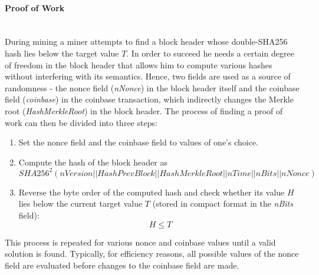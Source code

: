 \paragraph{Proof of Work}~\\
During mining a miner attempts to find a block header whose double-SHA256 hash lies below the target value $T$. In order to succeed he needs a certain degree of freedom in the block header that allows him to compute various hashes without interfering with its semantics. Hence, two fields are used as a source of randomness - the nonce field (\textit{nNonce}) in the block header itself and the coinbase field (\textit{coinbase}) in the coinbase transaction, which indirectly changes the Merkle root (\textit{HashMerkleRoot}) in the block header. The process of finding a proof of work can then be divided into three steps:

\begin{enumerate}[label=\arabic*), leftmargin=1cm]
\item Set the nonce field and the coinbase field to values of one's choice.
\item Compute the hash of the block header as
\begin{equation}
SHA256^{2}(nVersion||HashPrevBlock||HashMerkleRoot||nTime||nBits||nNonce)
\label{eqn:HashBlock}
\end{equation}
\item Reverse the byte order of the computed hash and check whether its value $\mathit{H}$ lies below the current target value $\mathit{T}$ (stored in compact format in the \textit{nBits} field):
\begin{equation}
H \leq T
\end{equation}

\end{enumerate}

\noindent
This process is repeated for various nonce and coinbase values until a valid solution is found. Typically, for efficiency reasons, all possible values of the nonce field are evaluated before changes to the coinbase field are made.